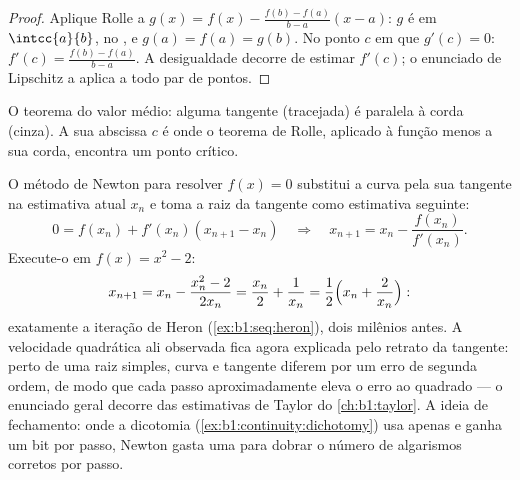 \begin{proof}
Aplique Rolle a $g(x) = f(x) - \frac{f(b) - f(a)}{b - a}(x - a)$: $g$
é  em $\intcc{a}{b}$,  no , e $g(a) =
f(a) = g(b)$. No ponto $c$ em que $g'(c) = 0$: $f'(c) =
\frac{f(b)-f(a)}{b-a}$. A desigualdade decorre de estimar $f'(c)$;
o enunciado de Lipschitz a aplica a todo par de pontos.
\end{proof}

\begin{omfigure}

{\small O teorema do valor médio: alguma tangente (tracejada) é paralela
à corda (cinza). A sua abscissa $c$ é onde o teorema de Rolle, aplicado
à função menos a sua corda, encontra um ponto crítico.}
\end{omfigure}

\begin{example}\label{ex:b1:derivative:newton}
O método de Newton para resolver $f(x) = 0$ substitui a curva pela
sua tangente na estimativa atual $x_n$ e toma a raiz da tangente
como estimativa seguinte:
\[
0 = f(x_n) + f'(x_n)(x_{n+1} - x_n)
\quad\Longrightarrow\quad
x_{n+1} = x_n - \frac{f(x_n)}{f'(x_n)} .
\]
Execute-o em $f(x) = x^2 - 2$:
\[
x_{n+1} = x_n - \frac{x_n^2 - 2}{2x_n}
= \frac{x_n}{2} + \frac{1}{x_n}
= \frac12\Bigl(x_n + \frac{2}{x_n}\Bigr) :
\]
exatamente a iteração de Heron (\cref{ex:b1:seq:heron}), dois
milênios antes. A velocidade quadrática ali observada fica agora
explicada pelo retrato da tangente: perto de uma raiz simples, curva e
tangente diferem por um erro de segunda ordem, de modo que cada passo
aproximadamente eleva o erro ao quadrado --- o enunciado geral decorre
das estimativas de Taylor do \cref{ch:b1:taylor}. A ideia de fechamento:
onde a dicotomia (\cref{ex:b1:continuity:dichotomy}) usa apenas
 e ganha um bit por passo, Newton gasta uma
 para dobrar o número de algarismos corretos por passo.
\end{example}

